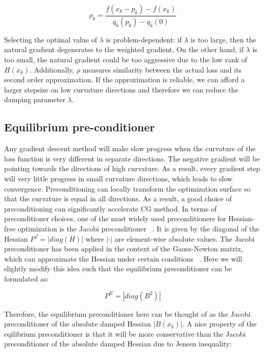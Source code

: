 \documentclass[10pt,twocolumn,letterpaper]{article}
\begin{document}
\begin{equation*}
\label{eq:rho}
\rho_k = \frac{f(x_k - p_k) - f(x_k)}{q_k(p_k) - q_k(0)}
\end{equation*}

Selecting the optimal value of $\lambda$ is problem-dependent: if $\lambda$ is too large, then the natural gradient degenerates to the weighted gradient. On the other hand, if $\lambda$ is too small, the natural gradient could be too aggressive due to the low rank of $H(x_k)$. Additionally, $\rho$ measures similarity between the actual loss and its second order approximation. If the approximation is reliable, we can afford a larger stepsize on low curvature directions and therefore we can reduce the damping parameter $\lambda$.


\subsection{Equilibrium pre-conditioner}
\label{sec:equilibrium_preconditioner}

Any gradient descent method will make slow progress when the curvature of the loss function is very different in separate directions. The negative gradient will be pointing towards the directions of high curvature. As a result, every gradient step will very little progress in small curvature directions, which leads to slow convergence. Preconditioning can locally transform the optimization surface so that the curvature is equal in all directions. As a result, a good choice of preconditioning can significantly accelerate CG method. In terms of preconditioner choices, one of the most widely used preconditioners for Hessian-free optimization is the Jacobi preconditioner ~\cite{Chapelle11}. It is given by the diagonal of the Hessian $P^J = |diag (H)|$ where $| \cdot |$ are element-wise absolute values. The Jacobi preconditioner has been applied in the context of the Gauss-Newton matrix, which can approximate the Hessian under certain conditions ~\cite{LeCun98, Razvan14}. Here we will slightly modify this idea such that the equilibrium preconditioner can be formulated as:

\begin{equation}
\label{eq:preconditioner}
P^E = |diag(B^2)|
\end{equation}

Therefore, the equilibrium preconditioner here can be thought of as the Jacobi preconditioner of the absolute damped Hessian $|B(x_k)|$. A nice property of the eqilibrium preconditioner is that it will be more conservative than the Jacobi preconditioner of the absolute damped Hessian due to Jensen inequality:
\end{document}
